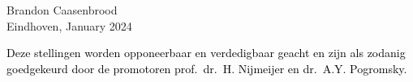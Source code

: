 \documentclass[a5paper]{article}
\begin{document}
\vfill
\begin{flushright}
Brandon Caasenbrood \\[0.15em]
Eindhoven, January 2024
\end{flushright} 

\begin{center}
\textcolor{black}{
\scriptsize Deze stellingen worden opponeerbaar en verdedigbaar geacht en zijn als zodanig goedgekeurd door de promotoren prof.\ dr.\ H. Nijmeijer en dr.\ A.Y. Pogromsky.
}
\end{center}

\end{document}

